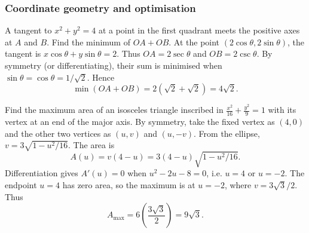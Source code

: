 \subsubsection{Coordinate geometry and optimisation}
\begin{enumerate}[label={},leftmargin=0pt,itemsep=9pt]
 A tangent to $x^2+y^2=4$ at a point in the first quadrant meets the positive axes at $A$ and $B$. Find the minimum of $OA+OB$.
\solution At the point $(2\cos\theta,2\sin\theta)$, the tangent is $x\cos\theta+y\sin\theta=2$. Thus $OA=2\sec\theta$ and $OB=2\csc\theta$. By symmetry (or differentiating), their sum is minimised when $\sin\theta=\cos\theta=1/\sqrt2$. Hence
\[
\boxed{\min(OA+OB)=2(\sqrt2+\sqrt2)=4\sqrt2}.
\]

 Find the maximum area of an isosceles triangle inscribed in $\frac{x^2}{16}+\frac{y^2}{9}=1$ with its vertex at an end of the major axis.
\solution By symmetry, take the fixed vertex as $(4,0)$ and the other two vertices as $(u,v)$ and $(u,-v)$. From the ellipse, $v=3\sqrt{1-u^2/16}$. The area is
\[
A(u)=v(4-u)=3(4-u)\sqrt{1-u^2/16}.
\]
Differentiation gives $A'(u)=0$ when $u^2-2u-8=0$, i.e. $u=4$ or $u=-2$. The endpoint $u=4$ has zero area, so the maximum is at $u=-2$, where $v=3\sqrt3/2$. Thus
\[
\boxed{A_{\max}=6\left(\frac{3\sqrt3}{2}\right)=9\sqrt3}.
\]
\end{enumerate}
